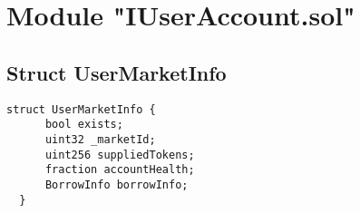 
\bigskip

\section{Module "IUserAccount.sol"}

\subsection{Struct UserMarketInfo}

\begin{lstlisting}[firstnumber=10]
  struct UserMarketInfo {
      bool exists;
      uint32 _marketId;
      uint256 suppliedTokens;
      fraction accountHealth;
      BorrowInfo borrowInfo;
  }
  \end{lstlisting}

